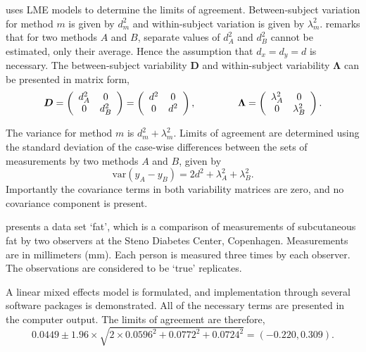 \documentclass[12pt, a4paper]{report}
\theoremstyle{plain}
\theoremstyle{definition}
\theoremstyle{remark}
\begin{document}
	\citet{BXC2008} uses LME models to determine the limits of agreement. Between-subject variation for method $m$ is given by $d^2_{m}$ and within-subject variation is given by $\lambda^2_{m}$.  \citet{BXC2008} remarks that for two methods $A$ and $B$, separate values of $d^2_{A}$ and $d^2_{B}$ cannot be estimated, only their average. Hence the assumption that $d_{x}= d_{y}= d$ is necessary. The between-subject variability $\boldsymbol{D}$ and within-subject variability $\boldsymbol{\Lambda}$ can be presented in matrix form,\[
	\boldsymbol{D} = \left(%
	\begin{array}{cc}
	d^2_{A}& 0 \\
	0 & d^2_{B} \\
	\end{array}%
	\right)=\left(%
	\begin{array}{cc}
	d^2& 0 \\
	0 & d^2\\
	\end{array}%
	\right),
	\hspace{1.5cm}
	\boldsymbol{\Lambda} = \left(%
	\begin{array}{cc}
	\lambda^2_{A}& 0 \\
	0 & \lambda^2_{B} \\
	\end{array}%
	\right).
	\]
	
	The variance for method $m$ is $d^2_{m}+\lambda^2_{m}$. Limits of agreement are determined using the standard deviation of the case-wise differences between the sets of measurements by two methods $A$ and $B$, given by
	\begin{equation}
	\mbox{var} (y_{A}-y_{B}) = 2d^2 + \lambda^2_{A}+ \lambda^2_{B}.
	\end{equation}
	Importantly the covariance terms in both variability matrices are zero, and no covariance component is present.
	
	\citet{BXC2008} presents a data set `fat', which is a comparison of measurements of subcutaneous fat
	by two observers at the Steno Diabetes Center, Copenhagen. Measurements are in millimeters
	(mm). Each person is measured three times by each observer. The observations are considered to be `true' replicates.
	
	A linear mixed effects model is formulated, and implementation through several software packages is demonstrated.
	All of the necessary terms are presented in the computer output. The limits of agreement are therefore,
	\begin{equation}
	0.0449  \pm 1.96 \times  \sqrt{2 \times 0.0596^2 + 0.0772^2 + 0.0724^2} = (-0.220,  0.309).
	\end{equation}
	
\end{document}
